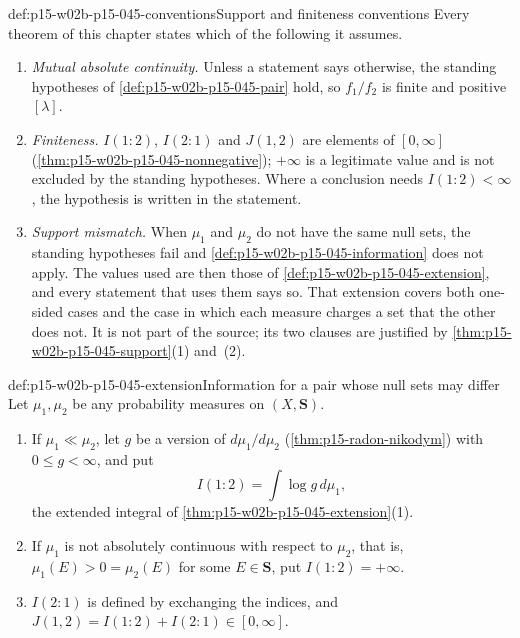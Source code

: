 \begin{hbconvention}{def:p15-w02b-p15-045-conventions}{Support and finiteness conventions}
Every theorem of this chapter states which of the following it assumes.
\begin{enumerate}
\item \emph{Mutual absolute continuity.} Unless a statement says
otherwise, the standing hypotheses of \cref{def:p15-w02b-p15-045-pair}
hold, so \(f_1/f_2\) is finite and positive \([\lambda]\).
\item \emph{Finiteness.} \(I(1:2)\), \(I(2:1)\) and \(J(1,2)\) are
elements of \([0,\infty]\) (\cref{thm:p15-w02b-p15-045-nonnegative});
\(+\infty\) is a legitimate value and is not excluded by the standing
hypotheses. Where a conclusion needs \(I(1:2)<\infty\), the
hypothesis is written in the statement.
\item \emph{Support mismatch.} When \(\mu_1\) and \(\mu_2\) do not have
the same null sets, the standing hypotheses fail and
\cref{def:p15-w02b-p15-045-information} does not apply. The values used
are then those of \cref{def:p15-w02b-p15-045-extension}, and every
statement that uses them says so. That extension covers both one-sided
cases and the case in which each measure charges a set that the other
does not. It is not part of the source; its two clauses are justified by
\cref{thm:p15-w02b-p15-045-support}(1) and~(2).
\end{enumerate}
\end{hbconvention}

\begin{hbdefinition}{def:p15-w02b-p15-045-extension}{Information for a pair whose null sets may differ}
Let \(\mu_1,\mu_2\) be any probability measures on \((X,\mathbf S)\).
\begin{enumerate}
\item If \(\mu_1\ll\mu_2\), let \(g\) be a version of
\(d\mu_1/d\mu_2\) (\cref{thm:p15-radon-nikodym}) with
\(0\leq g<\infty\), and put
\[
  I(1:2)=\int\log g\,d\mu_1,
\]
the extended integral of \cref{thm:p15-w02b-p15-045-extension}(1).
\item If \(\mu_1\) is not absolutely continuous with respect to
\(\mu_2\), that is, \(\mu_1(E)>0=\mu_2(E)\) for some \(E\in\mathbf S\),
put \(I(1:2)=+\infty\).
\item \(I(2:1)\) is defined by exchanging the indices, and
\(J(1,2)=I(1:2)+I(2:1)\in[0,\infty]\).
\end{enumerate}
\end{hbdefinition}

